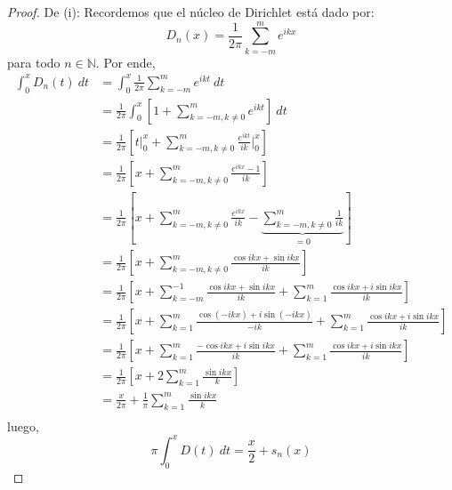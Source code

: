 \documentclass[12pt]{report}
\newcounter{it}
\theoremstyle{largebreak}
\begin{document}
    \begin{proof}
        De (i): Recordemos que el núcleo de Dirichlet está dado por:
        \begin{equation*}
            D_n(x)=\frac{1}{2\pi}\sum_{ k=-m}^m e^{ ikx}
        \end{equation*}
        para todo $n\in\mathbb{N}$. Por ende,
        \begin{equation*}
            \begin{split}
                \int_0^x D_n(t)\:dt&=\int_0^x \frac{1}{2\pi}\sum_{ k=-m}^m e^{ ikt}\:dt\\
                &=\frac{1}{2\pi}\int_0^x \left[1+\sum_{ k=-m,k\neq0}^m e^{ ikt}\right] \:dt\\
                &=\frac{1}{2\pi}\left[t\Big|_0^x+\sum_{ k=-m,k\neq0}^m \frac{e^{ ikt}}{ik}\Big|_0^{x} \right]\\
                &=\frac{1}{2\pi}\left[x+\sum_{ k=-m,k\neq0}^m \frac{e^{ ikx}-1}{ik} \right]\\
                &=\frac{1}{2\pi}\left[x+\sum_{ k=-m,k\neq0}^m \frac{e^{ ikx}}{ik}-\underbrace{\sum_{ k=-m,k\neq0}^m \frac{1}{ik}}_{=0} \right]\\
                &=\frac{1}{2\pi}\left[x+\sum_{ k=-m,k\neq0}^m \frac{\cos ikx+\sin ikx}{ik}\right]\\
                &=\frac{1}{2\pi}\left[x+\sum_{ k=-m}^{-1} \frac{\cos ikx+\sin ikx}{ik}+\sum_{ k=1}^m \frac{\cos ikx+i\sin ikx}{ik}\right]\\
                &=\frac{1}{2\pi}\left[x+\sum_{ k=1}^m \frac{\cos (-ikx)+i\sin (-ikx)}{-ik}+\sum_{ k=1}^m \frac{\cos ikx+i\sin ikx}{ik}\right]\\
                &=\frac{1}{2\pi}\left[x+\sum_{ k=1}^m \frac{-\cos ikx+i\sin ikx}{ik}+\sum_{ k=1}^m \frac{\cos ikx+i\sin ikx}{ik}\right]\\
                &=\frac{1}{2\pi}\left[x+2\sum_{ k=1}^m \frac{\sin ikx}{k}\right]\\
                &=\frac{x}{2\pi}+\frac{1}{\pi}\sum_{ k=1}^m \frac{\sin ikx}{k}\\
            \end{split}
        \end{equation*}
        luego,
        \begin{equation*}
            \pi\int_0^x D(t)\:dt=\frac{x}{2}+s_n(x)
        \end{equation*}


\end{proof}
\end{document}
